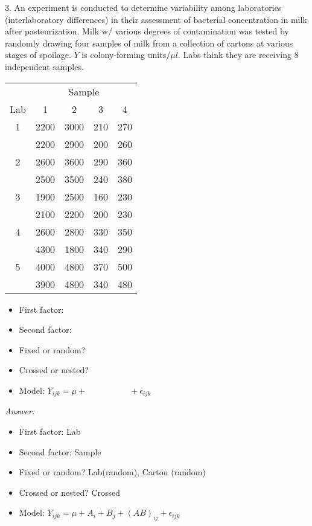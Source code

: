 3. An experiment is conducted to determine variability among laboratories (interlaboratory differences) in their assessment of bacterial concentration in milk after pasteurization.
Milk w/ various degrees of contamination was tested by randomly drawing four samples of milk from a collection of cartons at various stages of spoilage.
$Y$ is colony-forming units/$\mu l$.
Labs think they are receiving $8$ independent samples.

\begin{table}[H]
	\renewcommand{\arraystretch}{1.5}
	\centering
	\begin{tabular}{c|cccc}
		& \multicolumn{4}{c}{Sample} \\
		Lab & 1 & 2 & 3 & 4 \\
		\hline
		1 & 2200 & 3000 & 210 & 270\\
		  & 2200 & 2900 & 200 & 260\\		
		2 & 2600 & 3600 & 290 & 360\\
		  & 2500 & 3500 & 240 & 380\\
		3 & 1900 & 2500 & 160 & 230\\
		  & 2100 & 2200 & 200 & 230\\		  
		4 & 2600 & 2800 & 330 & 350\\\
		  & 4300 & 1800 & 340 & 290\\
		5 & 4000 & 4800 & 370 & 500\\
		  & 3900 & 4800 & 340 & 480\\		  
		\bottomrule
	\end{tabular}
\end{table}

\begin{itemize}
	\item First factor:  
	\item Second factor: 
	\item Fixed or random?  
	\item Crossed or nested?
	\item Model:  $Y_{ijk} = \mu  + \quad \quad \quad \quad \quad  + \epsilon_{ijk}$
\end{itemize}

{\it Answer:}\\
\begin{pf}
	\begin{itemize}
		\item First factor:  Lab
		\item Second factor: Sample
		\item Fixed or random?  Lab(random), Carton (random)
		\item Crossed or nested?  Crossed
		\item Model:  $Y_{ijk} = \mu + A_i + B_j + (AB)_{ij} + \epsilon_{ijk}$
	\end{itemize}
\end{pf}

